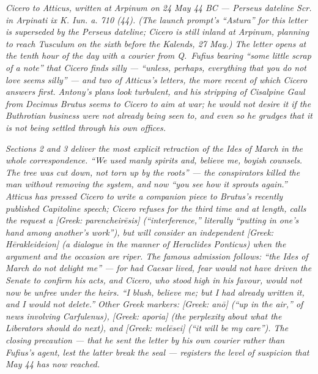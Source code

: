 
\textit{Cicero to Atticus, written at Arpinum on 24 May 44 BC
--- Perseus dateline \textit{Scr. in Arpinati ix K. Iun. a. 710
(44)}. (The launch prompt's ``Astura'' for this letter is
superseded by the Perseus dateline; Cicero is still inland at
Arpinum, planning to reach Tusculum on the sixth before the
Kalends, 27 May.) The letter opens at the tenth hour of the
day with a courier from Q.~Fufius bearing ``some little scrap
of a note'' that Cicero finds silly --- ``unless, perhaps,
everything that you do not love seems silly'' --- and two of
Atticus's letters, the more recent of which Cicero answers
first. Antony's plans look turbulent, and his stripping of
Cisalpine Gaul from Decimus Brutus seems to Cicero to aim at
war; he would not desire it if the Buthrotian business were
not already being seen to, and even so he grudges that it is
not being settled through his own offices.}

\textit{Sections 2 and 3 deliver the most explicit retraction
of the Ides of March in the whole correspondence. ``We used
manly spirits and, believe me, boyish counsels. The tree was
cut down, not torn up by the roots'' --- the conspirators
killed the man without removing the system, and now ``you see
how it sprouts again.'' Atticus has pressed Cicero to write a
companion piece to Brutus's recently published Capitoline
speech; Cicero refuses for the third time and at length, calls
the request a \textit{[Greek: parencheir\=esis]} (``interference,''
literally ``putting in one's hand among another's work''), but
will consider an independent \textit{[Greek: H\=erakleideion]}
(a dialogue in the manner of Heraclides Ponticus) when the
argument and the occasion are riper. The famous admission
follows: ``the Ides of March do not delight me'' --- for had
Caesar lived, fear would not have driven the Senate to confirm
his acts, and Cicero, who stood high in his favour, would not
now be unfree under the heirs. ``I blush, believe me; but I had
already written it, and I would not delete.'' Other Greek
markers: \textit{[Greek: an\=o]} (``up in the air,'' of news
involving Carfulenus), \textit{[Greek: aporia]} (the perplexity
about what the Liberators should do next), and \textit{[Greek:
mel\=esei]} (``it will be my care''). The closing precaution ---
that he sent the letter by his own courier rather than Fufius's
agent, lest the latter break the seal --- registers the level
of suspicion that May 44 has now reached.}

